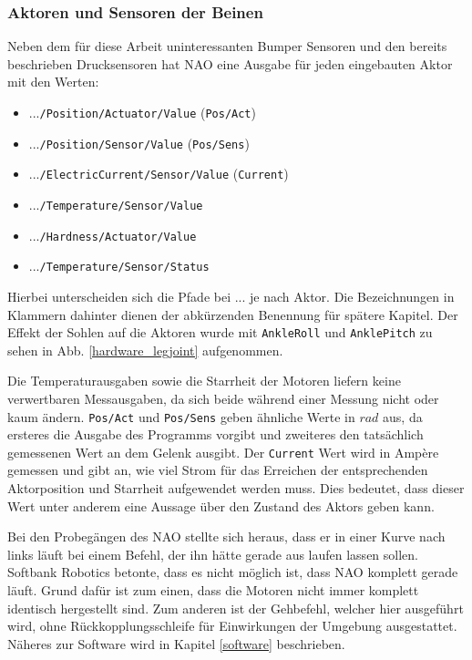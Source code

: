 \subsubsection*{Aktoren und Sensoren der Beinen}
Neben dem für diese Arbeit uninteressanten Bumper Sensoren und den bereits beschrieben Drucksensoren hat NAO eine Ausgabe für jeden eingebauten Aktor mit den Werten:
\begin{itemize}
	\item ...\texttt{/Position/Actuator/Value} (\texttt{Pos/Act})
	\item ...\texttt{/Position/Sensor/Value} (\texttt{Pos/Sens})
	\item ...\texttt{/ElectricCurrent/Sensor/Value} (\texttt{Current})
	\item ...\texttt{/Temperature/Sensor/Value}
	\item ...\texttt{/Hardness/Actuator/Value} 
	\item ...\texttt{/Temperature/Sensor/Status} 
\end{itemize}
Hierbei unterscheiden sich die Pfade bei \glqq ...\grqq{} je nach Aktor. Die Bezeichnungen in Klammern dahinter dienen der abkürzenden Benennung für spätere Kapitel. Der Effekt der Sohlen auf die Aktoren wurde mit \texttt{AnkleRoll} und \texttt{AnklePitch} zu sehen in Abb. \ref{hardware_legjoint} aufgenommen.

Die Temperaturausgaben sowie die Starrheit der Motoren liefern keine verwertbaren Messausgaben, da sich beide während einer Messung nicht oder kaum ändern. \texttt{Pos/Act} und \texttt{Pos/Sens} geben ähnliche Werte in $\unit{rad}$ aus, da ersteres die Ausgabe des Programms vorgibt und zweiteres den tatsächlich gemessenen Wert an dem Gelenk ausgibt. Der \texttt{Current} Wert wird in Ampère gemessen und gibt an, wie viel Strom für das Erreichen der entsprechenden Aktorposition und Starrheit aufgewendet werden muss. Dies bedeutet, dass dieser Wert unter anderem eine Aussage über den Zustand des Aktors geben kann. 

Bei den Probegängen des NAO stellte sich heraus, dass er in einer Kurve nach links läuft bei einem Befehl, der ihn hätte gerade aus laufen lassen sollen. Softbank Robotics betonte, dass es nicht möglich ist, dass NAO komplett gerade läuft. Grund dafür ist zum einen, dass die Motoren nicht immer komplett identisch hergestellt sind. Zum anderen ist der Gehbefehl, welcher hier ausgeführt wird, ohne Rückkopplungsschleife für Einwirkungen der Umgebung ausgestattet. Näheres zur Software wird in Kapitel \ref{software} beschrieben.

